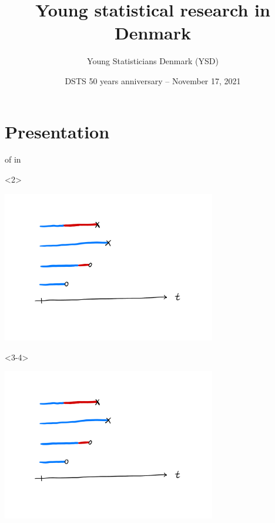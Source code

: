 \documentclass[smaller]{beamer}\usepackage{listings}
\author{Young Statisticians Denmark (YSD)}
\date{DSTS 50 years anniversary -- November 17, 2021}
\title{Young statistical research in Denmark}
\begin{document}
\maketitle
\section{Presentation}
\label{sec:org73ea23f}
\begin{frame}[label={sec:org2e9e86b}]{}
\large
{}
of
in
\normalsize
\vfill


\begin{onlyenv}<2>
\begin{center}
\includegraphics[page=1,width=0.7\textwidth,trim={1cm 5cm 6cm 3cm},clip]{./Multi-State-illustration.pdf}
\end{center}
\end{onlyenv}

\begin{onlyenv}<3-4>
\begin{center}
\includegraphics[page=2,width=0.7\textwidth,trim={1cm 5cm 6cm 3cm},clip]{./Multi-State-illustration.pdf}
\end{center}
\end{onlyenv}


\end{frame}
\end{document}
